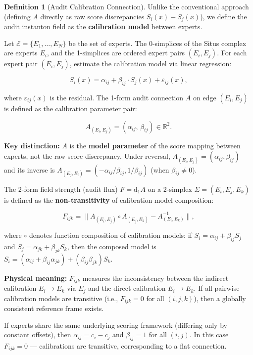 \documentclass[12pt,a4paper]{article}
\theoremstyle{plain}
\theoremstyle{definition}
\newtheorem{definition}[theorem]{Definition}
\theoremstyle{remark}
\newcommand{\R}{\mathbb{R}}
\newcommand{\dd}{\mathrm{d}}
\begin{document}
\begin{definition}[Audit Calibration Connection]
\label{def:instanton}
Unlike the conventional approach (defining $A$ directly as raw score discrepancies $S_i(x)-S_j(x)$), we define the audit instanton field as the \textbf{calibration model} between experts.

Let $\mathcal{E} = \{E_1, \ldots, E_N\}$ be the set of experts. The 0-simplices of the Situs complex are experts $E_i$, and the 1-simplices are ordered expert pairs $(E_i, E_j)$. For each expert pair $(E_i, E_j)$, estimate the calibration model via linear regression:

\begin{equation}\label{eq:calibration}
    S_i(x) = \alpha_{ij} + \beta_{ij} \cdot S_j(x) + \varepsilon_{ij}(x),
\end{equation}

where $\varepsilon_{ij}(x)$ is the residual. The 1-form audit connection $A$ on edge $(E_i, E_j)$ is defined as the calibration parameter pair:

\begin{equation}\label{eq:A_def}
    A_{(E_i, E_j)} = (\alpha_{ij}, \,\beta_{ij}) \in \R^2.
\end{equation}

\textbf{Key distinction:} $A$ is the \textbf{model parameter} of the score mapping between experts, not the raw score discrepancy. Under reversal, $A_{(E_i, E_j)} = (\alpha_{ij}, \beta_{ij})$ and its inverse is $A_{(E_j, E_i)} = (-\alpha_{ij}/\beta_{ij}, 1/\beta_{ij})$ (when $\beta_{ij} \neq 0$).

The 2-form field strength (audit flux) $F = \dd_1 A$ on a 2-simplex $\Sigma = (E_i, E_j, E_k)$ is defined as the \textbf{non-transitivity} of calibration model composition:

\begin{equation}\label{eq:F_def}
    F_{ijk} = \bigl\| A_{(E_i, E_j)} \circ A_{(E_j, E_k)} - A_{(E_i, E_k)}^{-1} \bigr\|,
\end{equation}

where $\circ$ denotes function composition of calibration models: if $S_i = \alpha_{ij} + \beta_{ij} S_j$ and $S_j = \alpha_{jk} + \beta_{jk} S_k$, then the composed model is $S_i = (\alpha_{ij} + \beta_{ij}\alpha_{jk}) + (\beta_{ij}\beta_{jk}) S_k$.

\textbf{Physical meaning:} $F_{ijk}$ measures the inconsistency between the indirect calibration $E_i \to E_k$ via $E_j$ and the direct calibration $E_i \to E_k$. If all pairwise calibration models are transitive (i.e., $F_{ijk}=0$ for all $(i,j,k)$), then a globally consistent reference frame exists.

If experts share the same underlying scoring framework (differing only by constant offsets), then $\alpha_{ij} = c_i - c_j$ and $\beta_{ij} = 1$ for all $(i,j)$. In this case $F_{ijk} = 0$ --- calibrations are transitive, corresponding to a flat connection.
\end{definition}
\end{document}
